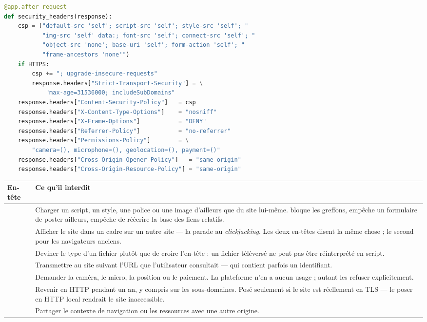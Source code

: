 \danslecode
\begin{lstlisting}[language=Python]
@app.after_request
def security_headers(response):
    csp = ("default-src 'self'; script-src 'self'; style-src 'self'; "
           "img-src 'self' data:; font-src 'self'; connect-src 'self'; "
           "object-src 'none'; base-uri 'self'; form-action 'self'; "
           "frame-ancestors 'none'")
    if HTTPS:
        csp += "; upgrade-insecure-requests"
        response.headers["Strict-Transport-Security"] = \
            "max-age=31536000; includeSubDomains"
    response.headers["Content-Security-Policy"]   = csp
    response.headers["X-Content-Type-Options"]    = "nosniff"
    response.headers["X-Frame-Options"]           = "DENY"
    response.headers["Referrer-Policy"]           = "no-referrer"
    response.headers["Permissions-Policy"]        = \
        "camera=(), microphone=(), geolocation=(), payment=()"
    response.headers["Cross-Origin-Opener-Policy"]   = "same-origin"
    response.headers["Cross-Origin-Resource-Policy"] = "same-origin"
\end{lstlisting}

\begin{center}
\small
\begin{tabularx}{\textwidth}{@{}p{4.3cm}X@{}}
\toprule
\textbf{En-tête} & \textbf{Ce qu'il interdit} \\
\midrule
\cmd{Content-Security-Policy} & Charger un script, un style, une police ou une
image d'ailleurs que du site lui-même. \cmd{object-src 'none'} bloque les
greffons, \cmd{form-action 'self'} empêche un formulaire de poster ailleurs,
\cmd{base-uri 'self'} empêche de réécrire la base des liens relatifs. \\
\cmd{frame-ancestors 'none'} \newline \cmd{X-Frame-Options: DENY} & Afficher le
site dans un cadre sur un autre site --- la parade au \emph{clickjacking}. Les
deux en-têtes disent la même chose ; le second pour les navigateurs anciens. \\
\cmd{X-Content-Type-Options} & Deviner le type d'un fichier plutôt que de
croire l'en-tête : un fichier téléversé ne peut pas être réinterprété en
script. \\
\cmd{Referrer-Policy: no-referrer} & Transmettre au site suivant l'URL que
l'utilisateur consultait --- qui contient parfois un identifiant. \\
\cmd{Permissions-Policy} & Demander la caméra, le micro, la position ou le
paiement. La plateforme n'en a aucun usage ; autant les refuser explicitement. \\
\cmd{Strict-Transport-Security} & Revenir en HTTP pendant un an, y compris sur
les sous-domaines. Posé seulement si le site est réellement en TLS --- le poser
en HTTP local rendrait le site inaccessible. \\
\cmd{Cross-Origin-*} & Partager le contexte de navigation ou les ressources
avec une autre origine. \\
\bottomrule
\end{tabularx}
\end{center}

